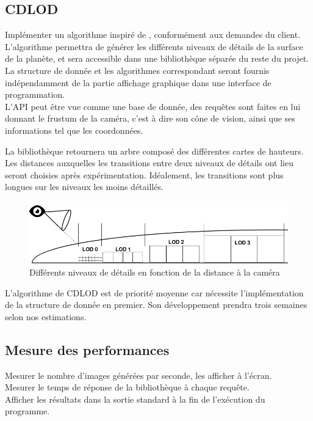 \documentclass[12pt]{report}
\begin{document}
\subsection{CDLOD}

Implémenter un algorithme inspiré de \cite{CDLOD}, conformément aux
demandes du client.  L'algorithme permettra de générer les différents
niveaux de détails de la surface de la planète, et sera accessible dans
une bibliothèque séparée du reste du projet. La structure de donnée et
les algorithmes correspondant seront fournis indépendamment de la partie
affichage graphique dans une interface de programmation.\\
L'API peut être vue comme une base de donnée, des requêtes sont faites
en lui donnant le frustum de la caméra, c'est à dire son cône de vision,
ainsi que ses informations tel que les coordonnées.

La bibliothèque retournera un arbre composé des différentes cartes de
hauteurs.\\

Les distances auxquelles les transitions entre deux niveaux de détails
ont lieu seront choisies après expérimentation. Idéalement, les
transitions sont plus longues sur les niveaux les moins détaillés.

\begin{center}
\begin{figure}[!h]
  \includegraphics[scale=0.5]{img/lods.png}
  \caption{Différents niveaux de détails en fonction de la distance à la
  caméra}
  \label{fig:lods}
\end{figure}
\end{center}

L'algorithme de CDLOD est de priorité moyenne car nécessite
l'implémentation de la structure de donnée en premier. Son
développement prendra trois semaines selon nos estimations.\\

\subsection{Mesure des performances}

Mesurer le nombre d'images générées par seconde, les afficher à
l'écran.\\
Mesurer le temps de réponse de la bibliothèque à chaque requête.\\
Afficher les résultats dans la sortie standard à la fin de l'exécution
du programme.\\
\end{document}
